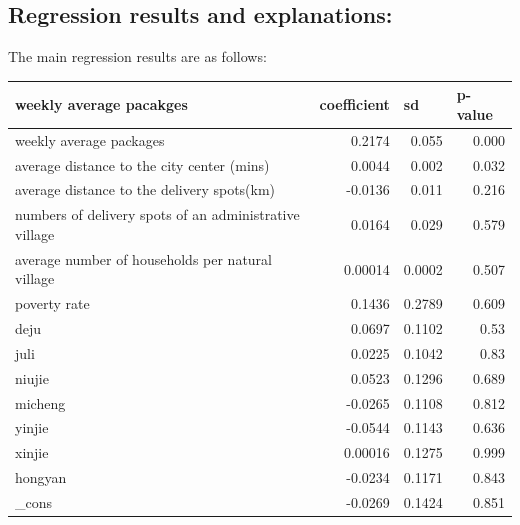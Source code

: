 \documentclass{article}
\begin{document}
\subsection{Regression results and explanations:}
The main regression results are as follows:\\
\begin{longtable}{|l|r|r|r|}
    \toprule
    weekly average pacakges & \multicolumn{1}{l|}{coefficient} & \multicolumn{1}{l|}{sd} & \multicolumn{1}{l|}{p-value} \\
    \midrule
    \multicolumn{1}{|p{5.09em}|}{weekly average packages} & 0.2174 & 0.055 & 0.000  \\
    \midrule
    average distance to the city center (mins) & 0.0044 & 0.002 & 0.032 \\
    \midrule
    average distance to the delivery spots(km) & -0.0136 & 0.011 & 0.216 \\
    \midrule
    numbers of delivery spots of an administrative village & 0.0164 & 0.029 & 0.579 \\
    \midrule
    average number of households per natural village & 0.00014 & 0.0002 & 0.507 \\
    \midrule
    poverty rate & 0.1436 & 0.2789 & 0.609 \\
    \midrule
    deju  & 0.0697 & 0.1102 & 0.53 \\
    \midrule
    juli  & 0.0225 & 0.1042 & 0.83 \\
    \midrule
    niujie & 0.0523 & 0.1296 & 0.689 \\
    \midrule
    micheng & -0.0265 & 0.1108 & 0.812 \\
    \midrule
    yinjie & -0.0544 & 0.1143 & 0.636 \\
    \midrule
    xinjie & 0.00016 & 0.1275 & 0.999 \\
    \midrule
    hongyan & -0.0234 & 0.1171 & 0.843 \\
    \midrule
    \_cons & -0.0269 & 0.1424 & 0.851 \\
    \bottomrule
    \end{longtable}%
\end{document}
